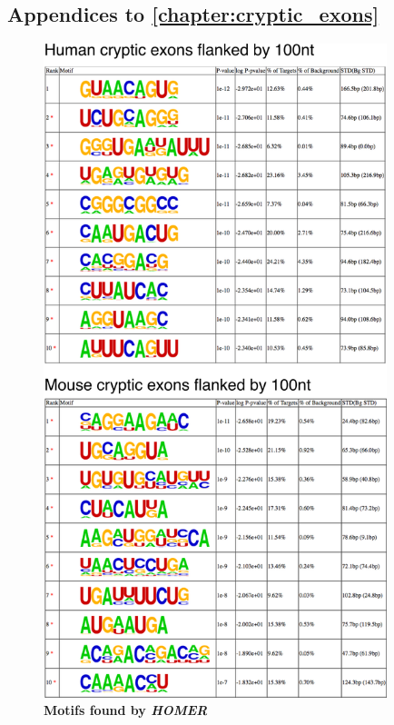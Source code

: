 
\begin{appendices}
\clearpage	


\section*{Appendices to \autoref{chapter:cryptic_exons} }

\begin{figure}
	\begin{center}
		\includegraphics[width=10cm]{Figures/03_cryptic_exons/Figure_S4_HOMER.png}
	\end{center}
	\caption{\textbf{Motifs found by \textit{HOMER}}}
\end{figure}

	\addtolength{\abovecaptionskip}{-25mm}



\end{appendices}
